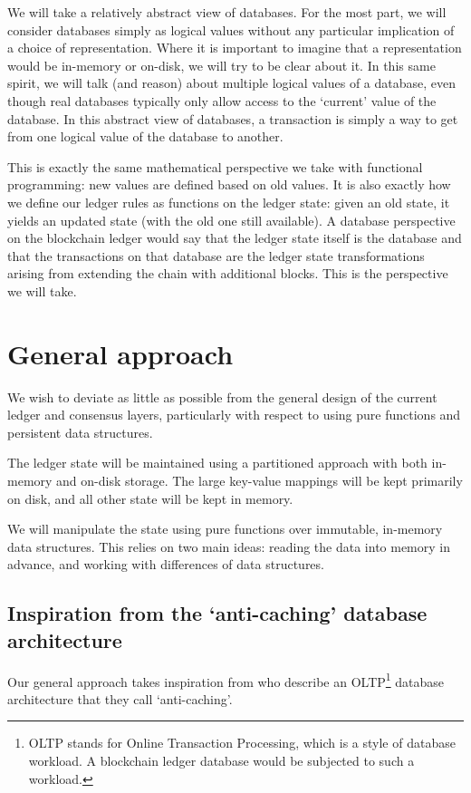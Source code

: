 \documentclass[11pt,a4paper]{article}
\begin{document}
We will take a relatively abstract view of databases. For the most part, we will
consider databases simply as logical values without any particular implication
of a choice of representation. Where it is important to imagine that a
representation would be in-memory or on-disk, we will try to be clear about
it. In this same spirit, we will talk (and reason) about multiple logical
values of a database, even though real databases typically only allow access
to the `current' value of the database. In this abstract view of databases, a
transaction is simply a way to get from one logical value of the database to
another.

This is exactly the same mathematical perspective we take with functional
programming: new values are defined based on old values. It is also exactly how
we define our ledger rules as functions on the ledger state: given an old state,
it yields an updated state (with the old one still available). A database
perspective on the blockchain ledger would say that the ledger state itself is
the database and that the transactions on that database are the ledger state
transformations arising from extending the chain with additional blocks. This is
the perspective we will take.

\section{General approach}
\label{general-approach}

We wish to deviate as little as possible from the general design of the current
ledger and consensus layers, particularly with respect to using pure functions
and persistent data structures.

The ledger state will be maintained using a partitioned approach with both
in-memory and on-disk storage. The large key-value mappings will be kept primarily on
disk, and all other state will be kept in memory.

We will manipulate the state using pure functions over immutable, in-memory data
structures. This relies on two main ideas: reading the data into memory in
advance, and working with differences of data structures.

\subsection{Inspiration from the `anti-caching' database architecture}
\label{anti-caching}

Our general approach takes inspiration from \citet{anti-caching} who describe an
OLTP\footnote{OLTP stands for Online Transaction Processing, which is a style of
database workload. A blockchain ledger database would be subjected to such a
workload.} database architecture that they call `anti-caching'.
\end{document}
